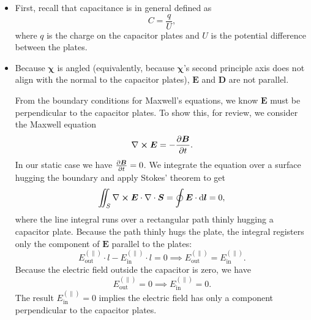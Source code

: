 \documentclass[11pt, a4paper]{article}
\newcommand{\diff}{\mathop{}\!\mathrm{d}} %
\renewcommand{\vec}[1]{\bm{#1}} %
\newcommand{\E}{\vec{E}}  %
\newcommand{\D}{\vec{D}}  %
\newcommand{\B}{\vec{B}}  %
\newcommand{\eee}{\bm{\chi}}  %
\renewcommand{\div}{\nabla \cdot}
\renewcommand{\curl}{\nabla \cross}
\begin{document}

\begin{itemize}
	\item First, recall that capacitance is in general defined as
	\begin{equation*}
		C = \frac{q}{U},
	\end{equation*}
	where $ q $ is the charge on the capacitor plates and $ U $ is the potential difference between the plates.
	
	\item Because $ \eee $ is angled (equivalently, because $ \eee $'s second principle axis does not align with the normal to the capacitor plates), $ \E $ and $ \D $ are not parallel. 
	
	From the boundary conditions for Maxwell's equations, we know $ \E $ must be perpendicular to the capacitor plates. To show this, for review, we consider the Maxwell equation
	\begin{equation*}
		\curl \E = - \pdv{\B}{t}.
	\end{equation*}
	In our static case we have $ \pdv{\B}{t} = 0 $. We integrate the equation over a surface hugging the boundary and apply Stokes' theorem to get 
	\begin{equation*}
		\iint_{S}\curl \E \cdot \div \vec{S} = \oint \E \cdot \diff \vec{l} = 0,
	\end{equation*}
	where the line integral runs over a rectangular path thinly hugging a capacitor plate. Because the path thinly hugs the plate, the integral registers only the component of $ \E $ parallel to the plates:
	\begin{equation*}
		E_{\text{out}}^{(\parallel)}\cdot l - E_{\text{in}}^{(\parallel)} \cdot l = 0 \implies E_{\text{out}}^{(\parallel)} = E_{\text{in}}^{(\parallel)}.
	\end{equation*}
	Because the electric field outside the capacitor is zero, we have
	\begin{equation*}
		E_{\text{out}}^{(\parallel)} = 0 \implies E_{\text{in}}^{(\parallel)} = 0.
	\end{equation*}
	The result $ E_{\text{in}}^{(\parallel)} = 0 $ implies the electric field has only a component perpendicular to the capacitor plates. 
	

\end{itemize}
\end{document}
